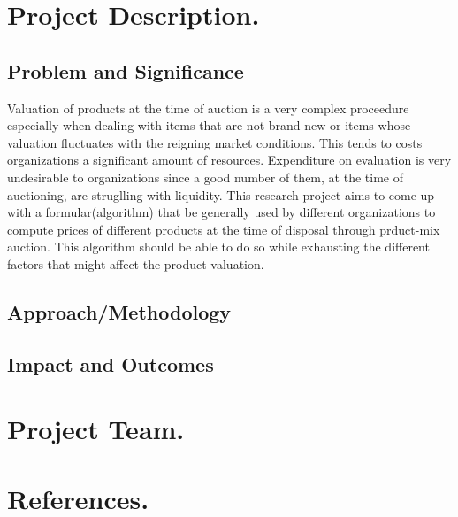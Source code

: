 \documentclass[11pt]{article} %
\begin{document}
\section{Project Description.}


\subsection{Problem and Significance}
Valuation of products at the time of auction is a very complex proceedure especially when dealing with items that are not brand new or items whose valuation fluctuates with the reigning market conditions. This tends to costs organizations a significant amount of resources. Expenditure on evaluation is very undesirable to organizations since a good number of them, at the time of auctioning, are struglling with liquidity.
This research project aims to come up with a formular(algorithm) that be generally used by different organizations to compute prices of different products at the time of disposal through prduct-mix auction. This algorithm should be able to do so while exhausting the different factors that might affect the product valuation.
\subsection{Approach/Methodology} 
\subsection{Impact and Outcomes}
\section{Project Team.}
\section{References.}
\end{document}
